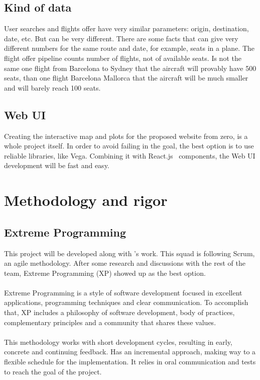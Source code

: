 \subsection{Kind of data}

User searches and flights offer have very similar parameters: origin, destination, date, etc. But can be very different. There are some facts that can give very different numbers for the same route and date, for example, seats in a plane. The flight offer pipeline counts number of flights, not of available seats. Is not the same one flight from Barcelona to Sydney that the aircraft will provably have 500 seats, than one flight Barcelona Mallorca that the aircraft will be much smaller and will barely reach 100 seats.

\subsection{Web UI}

Creating the interactive map and plots for the proposed website from zero, is a whole project itself. In order to avoid failing in the \textit{} goal, the best option is to use reliable libraries, like Vega\cite{vega}. Combining it with React.js \company\ components, the Web UI development will be fast and easy.


\section{Methodology and rigor} \label{methodology_rigor}

\subsection{Extreme Programming} \label{xp}

This project will be developed along with \squad's work. This squad is following Scrum, an agile methodology. After some research and discussions with the rest of the team, Extreme Programming (XP)\cite{xp} showed up as the best option.
\\\\
Extreme Programming is a style of software development focused in excellent applications, programming techniques and clear communication. To accomplish that, XP includes a philosophy of software development, body of practices, complementary principles and a community that shares these values.
\\\\
This methodology works with short development cycles, resulting in early, concrete and continuing feedback. Has an incremental approach, making way to a flexible schedule for the implementation. It relies in oral communication and tests to reach the goal of the project.

